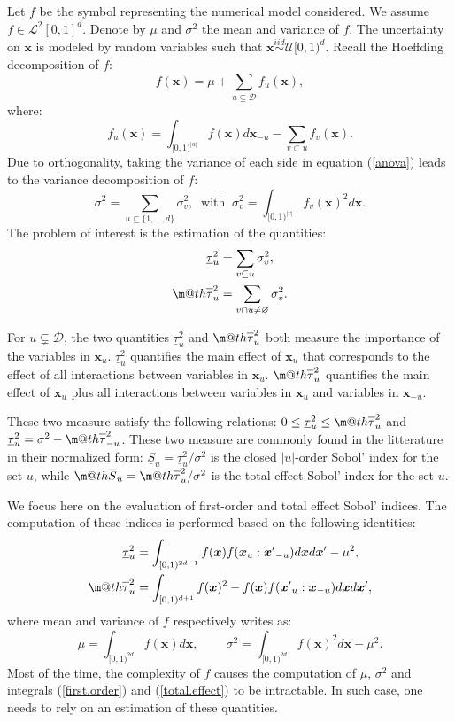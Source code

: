 \documentclass[]{elsarticle}
\makeatletter
\theoremstyle{definition}
\newcommand{\bvec}[1]{\boldsymbol{#1}}
\newcommand{\vx}{\bvec{x}}
\newcommand\iid{\stackrel{iid}{\sim}}
\newcommand*{\ov}[1]{
  \m@th\overline{\mbox{#1}\raisebox{2mm}{}}
}
\makeatother
\begin{document}
Let $f$ be the symbol representing the numerical model considered. We assume $f \in \mathcal{L}^2[0,1]^d$. Denote by $\mu$ and $\sigma^2$ the mean and variance of $f$.
The uncertainty on $\vx$ is modeled by random variables such that $\vx \iid \mathcal{U}[0,1)^d$. Recall the Hoeffding decomposition \cite{Hoeffding} of $f$:
\begin{equation}
f(\vx)=\mu+\sum \limits_{u \subseteq \mathcal{D}} f_u(\vx),
\label{anova}
\end{equation}
where:
\[f_u(\vx)= \int_{[0,1)^{|u|}} f(\vx) d{\vx}_{-u} - \sum \limits_{v \subset u} f_v(\vx).\]
Due to orthogonality, taking the variance of each side in equation (\ref{anova}) leads to the variance decomposition of $f$:
\[ \sigma^2 = \sum \limits_{u \subseteq \{1,\dots,d\}} \sigma_v^2, \ \text{ with } \ \sigma_v^2=\int_{[0,1)^{|v|}} f_v(\vx)^2 d{\vx}.\]
The problem of interest is the estimation of the quantities:
\begin{align*}
\underline{\tau}_u^2 &= \sum \limits_{v \subseteq u} \sigma_v^2, \\
\ov{$\tau$}_u^2 &= \sum \limits_{v \cap u \neq \varnothing} \sigma_v^2.
\end{align*}

For $u \subsetneq \mathcal{D}$, the two quantities $\underline{\tau}_u^2$ and $\ov{$\tau$}_u^2$ both measure the importance of the variables in $\vx_u$. $\underline{\tau}_u^2$ quantifies the main effect of $\vx_u$ that corresponds to the effect of all interactions between variables in $\vx_u$. $\ov{$\tau$}_u^2$ quantifies the main effect of $\vx_u$ plus all interactions between variables in $\vx_u$ and variables in $\vx_{-u}$.

These two measure satisfy the following relations: $ 0 \leq  \underline{\tau}_u^2 \leq \ov{$\tau$}_u^2$ and $\underline{\tau}_u^2 = \sigma^2 - \ov{$\tau$}_{-u}^2$. These two measure are commonly found in the litterature in their normalized form: $\underline{S}_u = \underline{\tau}_u^2 / \sigma^2$ is the closed $|u|$-order Sobol' index for the set $u$, while $\ov{$S$}_u = \ov{$\tau$}_u^2 / \sigma^2$ is the total effect Sobol' index for the set $u$.
\bigskip

We focus here on the evaluation of first-order and total effect Sobol' indices. The computation of these indices is performed based on the following identities:
\begin{align}
\label{first.order}
\underline{\tau}_u^2  &= \int_{[0,1)^{2d-1}} f(\vx) f(\vx_u:{\vx'}_{-u})d\vx d{\vx'}-\mu^2 , \\
\label{total.effect}
\ov{$\tau$}_u^2 &= \int_{[0,1)^{d+1}}f(\vx)^2-f(\vx)f({\vx'}_u:\vx_{-u})d\vx d{\vx'},
\end{align}
where mean and variance of $f$ respectively writes as:
\[ \mu = \int_{[0,1)^{2d}} f(\vx) d{\vx}, \ \qquad
\sigma^2 = \int_{[0,1)^{2d}} f(\vx)^2d{\vx} - \mu^2 .\]
Most of the time, the complexity of $f$ causes the computation of $\mu$, $\sigma^2$ and integrals (\ref{first.order}) and (\ref{total.effect}) to be intractable. In such case, one needs to rely on an estimation of these quantities.
\end{document}
